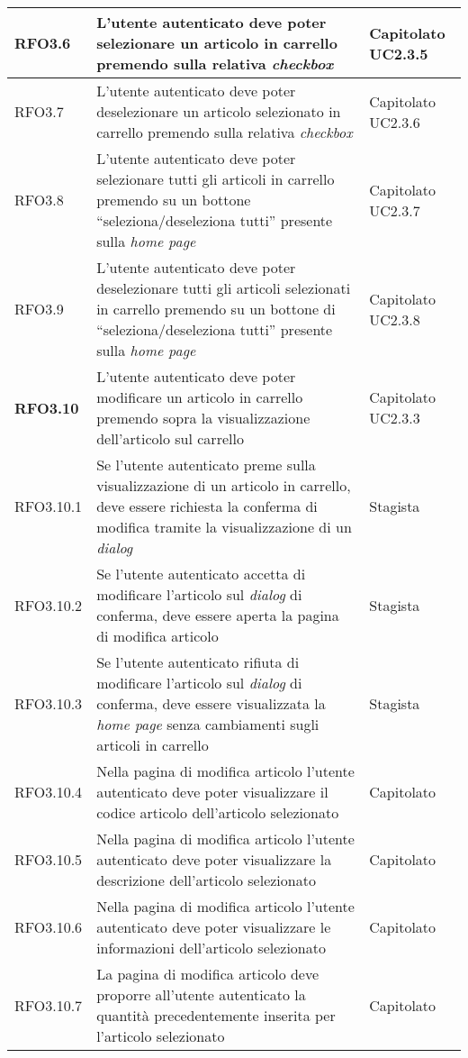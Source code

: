{\begin{center}
\begin{longtable}{ | >{\centering\arraybackslash}p{2.5cm} | >{\arraybackslash}p{7cm} | >{\centering\arraybackslash}p{2cm} | }
RFO3.6 & L'utente autenticato deve poter selezionare un articolo in carrello premendo sulla relativa \textit{checkbox} & Capitolato UC2.3.5\\ \hline
RFO3.7 & L'utente autenticato deve poter deselezionare un articolo selezionato in carrello premendo sulla relativa \textit{checkbox} & Capitolato UC2.3.6 \\ \hline
RFO3.8 & L'utente autenticato deve poter selezionare tutti gli articoli in carrello premendo su un bottone ``seleziona/deseleziona tutti'' presente sulla \textit{home page} & Capitolato UC2.3.7\\ \hline
RFO3.9 & L'utente autenticato deve poter deselezionare tutti gli articoli selezionati in carrello premendo su un bottone di ``seleziona/deseleziona tutti'' presente sulla \textit{home page} & Capitolato UC2.3.8 \\ \hline
\textbf{RFO3.10} & L'utente autenticato deve poter modificare un articolo in carrello premendo sopra la visualizzazione dell'articolo sul carrello & Capitolato UC2.3.3\\ \hline
RFO3.10.1 & Se l'utente autenticato preme sulla visualizzazione di un articolo in carrello, deve essere richiesta la conferma di modifica tramite la visualizzazione di un \textit{dialog} & Stagista \\ \hline
RFO3.10.2 & Se l'utente autenticato accetta di modificare l'articolo sul \textit{dialog} di conferma, deve essere aperta la pagina di modifica articolo & Stagista \\ \hline
RFO3.10.3 & Se l'utente autenticato rifiuta di modificare l'articolo sul \textit{dialog} di conferma, deve essere visualizzata la \textit{home page} senza cambiamenti sugli articoli in carrello & Stagista \\ \hline
RFO3.10.4 & Nella pagina di modifica articolo l'utente autenticato deve poter visualizzare il codice articolo dell'articolo selezionato & Capitolato \\ \hline
RFO3.10.5 & Nella pagina di modifica articolo l'utente autenticato deve poter visualizzare la descrizione dell'articolo selezionato & Capitolato \\ \hline
RFO3.10.6 & Nella pagina di modifica articolo l'utente autenticato deve poter visualizzare le informazioni dell'articolo selezionato & Capitolato \\ \hline
RFO3.10.7 & La pagina di modifica articolo deve proporre all'utente autenticato la quantità precedentemente inserita per l'articolo selezionato & Capitolato \\ \hline

\end{longtable}
\end{center}}

